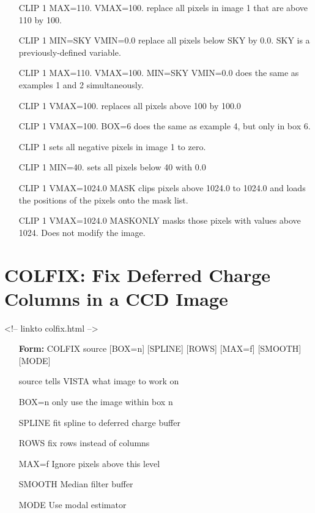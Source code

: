 \begin{itemize}
  \item[CLIP 1 MAX=110. VMAX=100.\hfill]{replace all pixels in image 1
       that are above 110 by 100.}
  \item[CLIP 1 MIN=SKY VMIN=0.0\hfill]{replace all pixels below SKY
       by 0.0.  SKY is a previously-defined variable.}
  \item[CLIP 1 MAX=110. VMAX=100. MIN=SKY VMIN=0.0\hfill]{
       does the same as examples 1 and 2 simultaneously.}
  \item[CLIP 1 VMAX=100.\hfill]{replaces all pixels above 100 by 100.0}
  \item[CLIP 1 VMAX=100. BOX=6\hfill]{does the same as example 4,
       but only in box 6.}
  \item[CLIP 1\hfill]{sets all negative pixels in image 1 to zero.}
  \item[CLIP 1 MIN=40.\hfill]{sets all pixels below 40 with 0.0}
  \item[CLIP 1 VMAX=1024.0 MASK\hfill]{clips pixels above 1024.0 to
       1024.0 and loads the positions of the pixels onto the mask list.}
  \item[CLIP 1 VMAX=1024.0 MASKONLY\hfill]{masks those pixels with values
       above 1024.  Does not modify the image.}
\end{itemize}

\section{COLFIX: Fix Deferred Charge Columns in a CCD Image}
\begin{rawhtml}
<!-- linkto colfix.html -->
\end{rawhtml}

\begin{itemize}
  \item[\textbf{Form: }  COLFIX source {[BOX=n]} {[SPLINE]} {[ROWS]} 
       {[MAX=f]} {[SMOOTH]} {[MODE]}\hfill]{}
  \item[source]{tells VISTA what image to work on}
  \item[BOX=n]{only use the image within box n}
  \item[SPLINE]{fit spline to deferred charge buffer}
  \item[ROWS]{fix rows instead of columns}
  \item[MAX=f]{Ignore pixels above this level}
  \item[SMOOTH]{Median filter buffer}
  \item[MODE]{Use modal estimator}
\end{itemize}

